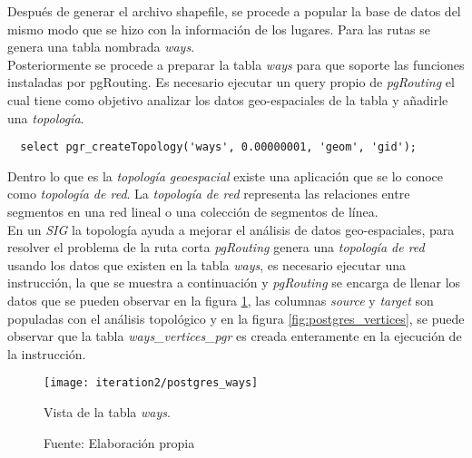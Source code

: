 
Después de generar el archivo shapefile, se procede a popular la base de datos del mismo modo que se hizo con la información de los lugares. Para las rutas se genera una tabla nombrada \emph{ways}.\\

Posteriormente se procede a preparar la tabla \emph{ways} para que soporte las funciones instaladas por pgRouting.
Es necesario ejecutar un query propio de \emph{pgRouting} el cual tiene como objetivo analizar los datos geo-espaciales de la tabla y añadirle una \emph{topología}.\\

\begin{verbatim}
  select pgr_createTopology('ways', 0.00000001, 'geom', 'gid');
\end{verbatim}

Dentro lo que es la \emph{topología geoespacial} existe una aplicación que se lo conoce como \emph{topología de red}. La \emph{topología de red} representa las relaciones entre segmentos en una red lineal o una colección de segmentos de línea. \cite{osgeo_journal_topology} \\

En un \emph{SIG} la topología ayuda a mejorar el análisis de datos geo-espaciales, para resolver el problema de la ruta corta \emph{pgRouting} genera una \emph{topología de red} usando los datos que existen en la tabla \emph{ways}, es necesario ejecutar una instrucción, la que se muestra a continuación y \emph{pgRouting} se encarga de llenar los datos que se pueden observar en la figura \ref{fig:postgres_ways}, las columnas \emph{source} y \emph{target} son populadas con el análisis topológico y en la figura \ref{fig:postgres_vertices}, se puede observar que la tabla \emph{ways\_vertices\_pgr} es creada enteramente en la ejecución de la instrucción.\\

\begin{figure}[H]
  \begin{center}
    \texttt{[image: iteration2/postgres\_ways]}
    \caption{Vista de la tabla \emph{ways}.}
    \label{fig:postgres_ways}
    \caption*{Fuente: Elaboración propia}
  \end{center}
\end{figure}

